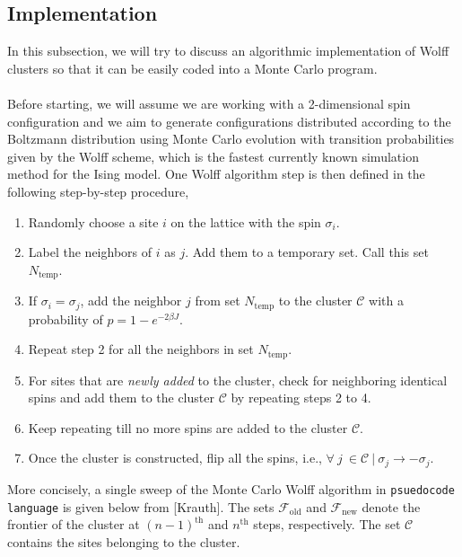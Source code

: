 \documentclass[../journal_main.tex]{subfiles}
\begin{document}
\subsection{Implementation}
In this subsection, we will try to discuss an algorithmic implementation of Wolff clusters so that it can be easily coded into a Monte Carlo program.~\\~\\
Before starting, we will assume we are working with a 2-dimensional spin configuration and we aim to generate configurations distributed according to the Boltzmann distribution using Monte Carlo evolution with transition probabilities given by the Wolff scheme, which is the fastest currently known simulation method for the Ising model. One Wolff algorithm step is then defined in the following step-by-step procedure,
\begin{enumerate}
    \setlength\itemsep{0.3em}
    \item Randomly choose a site $i$ on the lattice with the spin $\sigma_i$.
    \item Label the neighbors of $i$ as $j$. Add them to a temporary set. Call this set $N_\text{temp}$. 
    \item If $\sigma_i = \sigma_j$, add the neighbor $j$ from set $N_\text{temp}$ to the cluster $\mathcal{C}$  with a probability of $p = 1 - e^{-2\beta J}$.
    \item Repeat step 2 for all the neighbors in set $N_\text{temp}$.
    \item For sites that are \textit{newly added} to the cluster, check for neighboring identical spins and add them to the cluster $\mathcal{C}$ by repeating steps 2 to 4.
    \item Keep repeating till no more spins are added to the cluster $\mathcal{C}$.
    \item Once the cluster is constructed, flip all the spins, i.e., $\forall \:j \: \in \mathcal{C} \: | \: \sigma_j \to - \sigma_j$.
\end{enumerate}
More concisely, a single sweep of the Monte Carlo Wolff algorithm in \texttt{psuedocode language} is given below from [Krauth]. The sets $\mathcal{F}_\text{old}$ and $\mathcal{F}_\text{new}$ denote the frontier of the cluster at $(n-1)^\text{th}$ and $n^\text{th}$ steps, respectively. The set $\mathcal{C}$ contains the sites belonging to the cluster.~\\~\\
\end{document}
